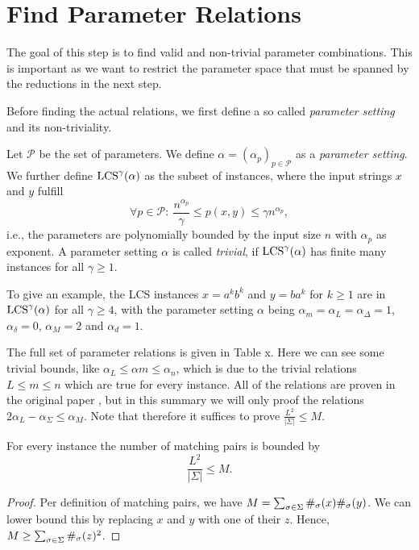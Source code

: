 \section{Find Parameter Relations}
The goal of this step is to find valid and non-trivial parameter combinations.
This is important as we want to restrict the parameter space that must be spanned by the reductions in the next step.

Before finding the actual relations, we first define a so called \emph{parameter setting} and its non-triviality.

\begin{definition}
Let $\mathcal{P}$ be the set of parameters.
We define $\mathbb{\alpha} = (\alpha_p)_{p \in \mathcal{P}}$ as a \emph{parameter setting}.
We further define $\text{LCS}^\gamma(\mathbb{\alpha})$ as the subset of \lcs{} instances, where the input strings $x$ and $y$ fulfill
\begin{displaymath}
	\forall p \in \mathcal{P}: \  \frac{n^{\alpha_p}}{\gamma} \leq p(x,y) \leq \gamma n^{\alpha_p},
\end{displaymath}
i.e., the parameters are polynomially bounded by the input size $n$ with $\alpha_p$ as exponent.
A parameter setting $\mathbb{\alpha}$ is called \emph{trivial}, if $\text{LCS}^\gamma(\alpha)$ has finite many instances for all $\gamma \geq 1$.
\end{definition}
%
To give an example, the LCS instances $x=a^{k}b^{k}$ and $y = ba^k$ for $k\geq 1$ are in $\text{LCS}^\gamma(\mathbb{\alpha})$ for all $\gamma \geq 4$, with the parameter setting $\mathbb{\alpha}$ being $\alpha_m = \alpha_L = \alpha_\Delta = 1$, $\alpha_\delta = 0$, $\alpha_M = 2$ and $\alpha_d = 1$.


The full set of parameter relations is given in Table x.
Here we can see some trivial bounds, like $\alpha_L \leq \alpha m \leq \alpha_n$, which is due to the trivial relations $L \leq m \leq n$ which are true for every \lcs{} instance.
All of the relations are proven in the original paper \cite[section 6]{Bringman.2018}, but in this summary we will only proof the relations $2\alpha_L - \alpha_\Sigma \leq \alpha_M$.
Note that therefore it suffices to prove $\frac{L^2}{|\Sigma|} \leq M$.

\begin{theorem}
For every \lcs{} instance the number of matching pairs is bounded by
\begin{displaymath}
	\dfrac{L^2}{|\Sigma|} \leq M .
\end{displaymath}
\end{theorem}

\begin{proof}
Per definition of matching pairs, we have $M = \sum_{\sigma \in \Sigma} \#_{\sigma}(x) \#_{\sigma}(y)$.
We can lower bound this by replacing $x$ and $y$ with one of their \lcs{} $z$.
Hence, $M \geq \sum_{\sigma \in \Sigma} \#_{\sigma}(z)^2$.
\end{proof}




